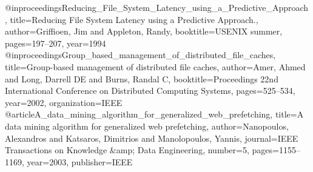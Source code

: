 @inproceedings{Reducing_File_System_Latency_using_a_Predictive_Approach,
  title={Reducing File System Latency using a Predictive Approach.},
  author={Griffioen, Jim and Appleton, Randy},
  booktitle={USENIX summer},
  pages={197--207},
  year={1994}
} 
@inproceedings{Group_based_management_of_distributed_file_caches,
  title={Group-based management of distributed file caches},
  author={Amer, Ahmed and Long, Darrell DE and Burns, Randal C},
  booktitle={Proceedings 22nd International Conference on Distributed Computing Systems},
  pages={525--534},
  year={2002},
  organization={IEEE}
}
@article{A_data_mining_algorithm_for_generalized_web_prefetching,
  title={A data mining algorithm for generalized web prefetching},
  author={Nanopoulos, Alexandros and Katsaros, Dimitrios and Manolopoulos, Yannis},
  journal={IEEE Transactions on Knowledge \&amp; Data Engineering},
  number={5},
  pages={1155--1169},
  year={2003},
  publisher={IEEE}
}